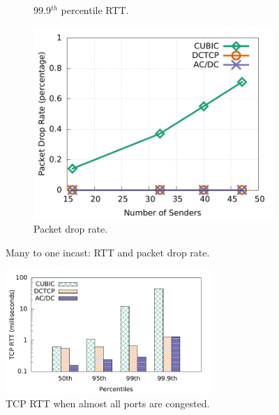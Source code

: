 \begin{figure}[!t]
\begin{subfigure}[b]{0.45\textwidth}
                \caption{99.9$^{th}$ percentile RTT.}
                \label{incast_9k_999th_sockperf}
        \end{subfigure}
        \begin{subfigure}[b]{0.45\textwidth}
                \centering
                \includegraphics[width=\textwidth]{acdctcp/figures/incast/plots9k/incast_droprate_vary_sender.pdf}
                \caption{Packet drop rate.}
                \label{incast_9k_droprate}
        \end{subfigure}
        \caption{Many to one incast: RTT and packet drop rate.}
        \label{incast_9k_sockperf_droprate}
\end{figure}


\begin{figure}[!t]
        \centering
  \includegraphics[width=0.7\textwidth]{acdctcp/figures/incast/pressure/incast_pressure_compare_sockperf.pdf}
        \caption{TCP RTT when almost all ports are congested.}
        \label{sockperf_pressure_incast}
\end{figure}



